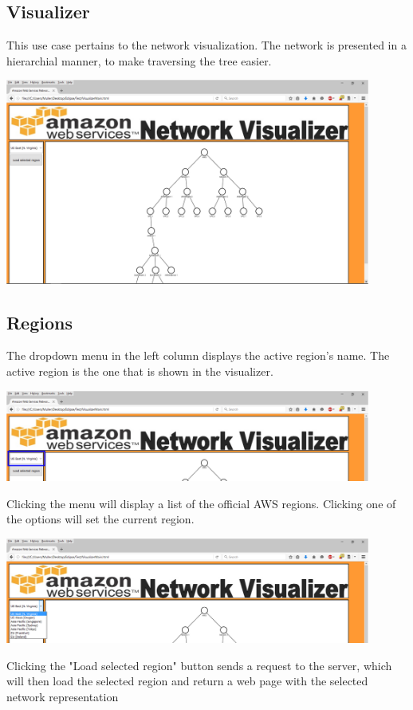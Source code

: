 \documentclass[hidelinks,a4paper,12pt]{article}
\begin{document}
	\newpage	
	\subsection{Visualizer}
		This use case pertains to the network visualization. The network is presented in a hierarchial manner, to make traversing the tree easier.
		
		\includegraphics[width=0.9\textwidth]{./images/Visualizer1.png}
	\subsection{Regions}
		The dropdown menu in the left column displays the active region's name. The active region is the one that is shown in the visualizer.
	
		\includegraphics[width=0.9\textwidth]{./images/Visualizer2.png}
		
		Clicking the menu will display a list of the official AWS regions. Clicking one of the options will set the current region.
			
		\includegraphics[width=0.9\textwidth]{./images/Visualizer3.png}
		
		\newpage
		Clicking the "Load selected region" button sends a request to the server, which will then load the selected region and return a web page with the selected network representation
		
\end{document}
